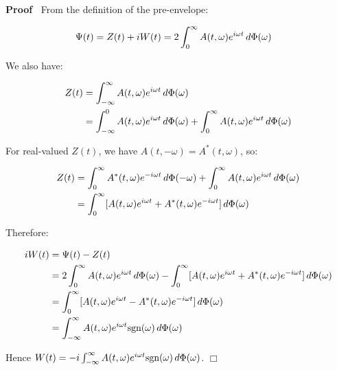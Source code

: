 \documentclass{article}
\newenvironment{proof}{\noindent\textbf{Proof\ }}{\hspace*{\fill}$\Box$\medskip}
\begin{document}
\begin{proof}
  From the definition of the pre-envelope:
  
  \begin{align}
    \Psi (t) & = Z (t) + iW (t) = 2 \int_0^{\infty} A (t, \omega) e^{i \omega
    t}  \hspace{0.17em} d \Phi (\omega) 
  \end{align}
  
  We also have:
  
  \begin{align}
    Z (t) & = \int_{- \infty}^{\infty} A (t, \omega) e^{i \omega t} 
    \hspace{0.17em} d \Phi (\omega) \\
    & = \int_{- \infty}^0 A (t, \omega) e^{i \omega t}  \hspace{0.17em} d
    \Phi (\omega) + \int_0^{\infty} A (t, \omega) e^{i \omega t} 
    \hspace{0.17em} d \Phi (\omega) 
  \end{align}
  
  For real-valued $Z (t)$, we have $A (t, - \omega) = A^{\ast} (t, \omega)$,
  so:
  
  \begin{align}
    Z (t) & = \int_0^{\infty} A^{\ast} (t, \omega) e^{- i \omega t} 
    \hspace{0.17em} d \Phi (- \omega) + \int_0^{\infty} A (t, \omega) e^{i
    \omega t}  \hspace{0.17em} d \Phi (\omega) \\
    & = \int_0^{\infty} [A (t, \omega) e^{i \omega t} + A^{\ast} (t, \omega)
    e^{- i \omega t}]  \hspace{0.17em} d \Phi (\omega) 
  \end{align}
  
  Therefore:
  
  \begin{align}
    iW (t) & = \Psi (t) - Z (t) \\
    & = 2 \int_0^{\infty} A (t, \omega) e^{i \omega t}  \hspace{0.17em} d
    \Phi (\omega) - \int_0^{\infty} [A (t, \omega) e^{i \omega t} + A^{\ast}
    (t, \omega) e^{- i \omega t}]  \hspace{0.17em} d \Phi (\omega) \\
    & = \int_0^{\infty} [A (t, \omega) e^{i \omega t} - A^{\ast} (t, \omega)
    e^{- i \omega t}]  \hspace{0.17em} d \Phi (\omega) \\
    & = \int_{- \infty}^{\infty} A (t, \omega) e^{i \omega t} \text{sgn}
    (\omega)  \hspace{0.17em} d \Phi (\omega) 
  \end{align}
  
  Hence $W (t) = - i \int_{- \infty}^{\infty} A (t, \omega) e^{i \omega t}
  \text{sgn} (\omega)  \hspace{0.17em} d \Phi (\omega)$.
\end{proof}
\end{document}
